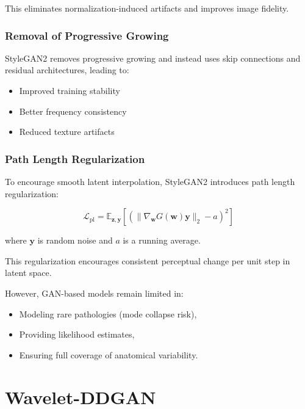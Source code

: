 This eliminates normalization-induced artifacts and improves image fidelity.

\subsubsection{Removal of Progressive Growing}

StyleGAN2 removes progressive growing and instead uses skip connections and residual architectures, leading to:

\begin{itemize}
    \item Improved training stability
    \item Better frequency consistency
    \item Reduced texture artifacts
\end{itemize}

\subsubsection{Path Length Regularization}

To encourage smooth latent interpolation, StyleGAN2 introduces path length regularization:

\begin{equation}
\mathcal{L}_{\text{pl}} =
\mathbb{E}_{\mathbf{z}, \mathbf{y}}
\left[
\left(
\|\nabla_{\mathbf{w}} G(\mathbf{w}) \mathbf{y}\|_2 - a
\right)^2
\right]
\end{equation}

where $\mathbf{y}$ is random noise and $a$ is a running average.

This regularization encourages consistent perceptual change per unit step in latent space.

\bigskip



However, GAN-based models remain limited in:

\begin{itemize}
    \item Modeling rare pathologies (mode collapse risk),
    \item Providing likelihood estimates,
    \item Ensuring full coverage of anatomical variability.
\end{itemize}





\section{Wavelet-DDGAN}

